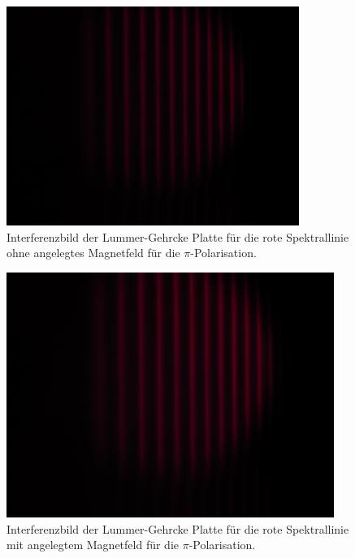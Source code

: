 \begin{figure}[h!]
  \centering
  \includegraphics[width=0.85\textwidth]{data/temp/rot_ohneB_90.JPG}
  \caption{Interferenzbild der Lummer-Gehrcke Platte für die rote Spektrallinie ohne angelegtes Magnetfeld für die $\pi$-Polarisation.}
  \label{fig:roteOhneB90}
\end{figure}
\begin{figure}[h!]
  \centering
  \includegraphics[width=0.95\textwidth]{data/temp/rot_mitB_90.JPG}
  \caption{Interferenzbild der Lummer-Gehrcke Platte für die rote Spektrallinie mit angelegtem Magnetfeld für die $\pi$-Polarisation.}
  \label{fig:rotMitB90}
\end{figure}

